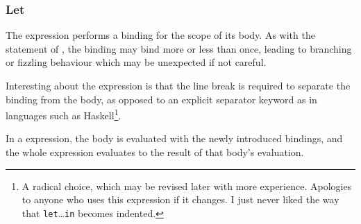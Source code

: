 \subsubsection{Let}

The  expression performs a binding for the scope of its body. As with
the  statement of \Prose{}, the binding may bind more or less than once,
leading to branching or fizzling behaviour which may be unexpected if not careful.

Interesting about the  expression is that the line break is required to
separate the binding from the body, as opposed to an explicit separator keyword
as in languages such as Haskell\footnote{A radical choice, which may be revised later
with more experience. Apologies to anyone who uses this expression if it changes. I
just never liked the way that \texttt{let}\dots\texttt{in} becomes indented.}.

\begin{bnf*}
\end{bnf*}

In a  expression, the body is evaluated with the newly introduced bindings,
and the whole expression evaluates to the result of that body's evaluation.

\begin{prooftree}
\end{prooftree}
